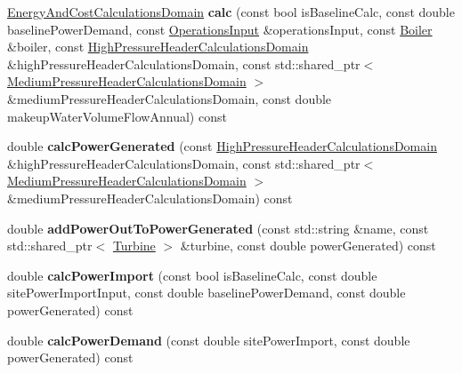 \begin{DoxyCompactItemize}
\hyperlink{class_energy_and_cost_calculations_domain}{Energy\+And\+Cost\+Calculations\+Domain} {\bfseries calc} (const bool is\+Baseline\+Calc, const double baseline\+Power\+Demand, const \hyperlink{class_operations_input}{Operations\+Input} \&operations\+Input, const \hyperlink{class_boiler}{Boiler} \&boiler, const \hyperlink{class_high_pressure_header_calculations_domain}{High\+Pressure\+Header\+Calculations\+Domain} \&high\+Pressure\+Header\+Calculations\+Domain, const std\+::shared\+\_\+ptr$<$ \hyperlink{class_medium_pressure_header_calculations_domain}{Medium\+Pressure\+Header\+Calculations\+Domain} $>$ \&medium\+Pressure\+Header\+Calculations\+Domain, const double makeup\+Water\+Volume\+Flow\+Annual) const
\item 
\mbox{\label{class_energy_and_cost_calculator_a25f512a60f88cc36af0fc0978d841c8a}} 
double {\bfseries calc\+Power\+Generated} (const \hyperlink{class_high_pressure_header_calculations_domain}{High\+Pressure\+Header\+Calculations\+Domain} \&high\+Pressure\+Header\+Calculations\+Domain, const std\+::shared\+\_\+ptr$<$ \hyperlink{class_medium_pressure_header_calculations_domain}{Medium\+Pressure\+Header\+Calculations\+Domain} $>$ \&medium\+Pressure\+Header\+Calculations\+Domain) const
\item 
\mbox{\label{class_energy_and_cost_calculator_acea571a402a377985753ebfaebad6fcc}} 
double {\bfseries add\+Power\+Out\+To\+Power\+Generated} (const std\+::string \&name, const std\+::shared\+\_\+ptr$<$ \hyperlink{class_turbine}{Turbine} $>$ \&turbine, const double power\+Generated) const
\item 
\mbox{\label{class_energy_and_cost_calculator_ad96cc7f912704f33786868447da091c3}} 
double {\bfseries calc\+Power\+Import} (const bool is\+Baseline\+Calc, const double site\+Power\+Import\+Input, const double baseline\+Power\+Demand, const double power\+Generated) const
\item 
\mbox{\label{class_energy_and_cost_calculator_a550d20d74d601e4f5e28e70f25565593}} 
double {\bfseries calc\+Power\+Demand} (const double site\+Power\+Import, const double power\+Generated) const
\item 
\mbox{\label{class_energy_and_cost_calculator_a9618725f55b74948cb1eaf8e79ddf1c6}} 

\end{DoxyCompactItemize}
